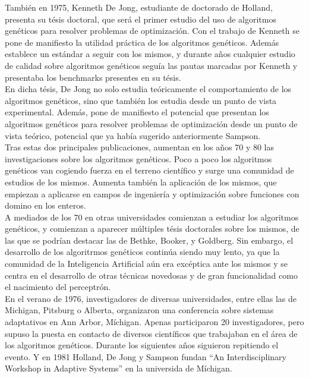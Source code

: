\documentclass[12pt]{article} \usepackage[utf8x]{inputenc}
\begin{document}
También en 1975, Kenneth De Jong, estudiante de doctorado de Holland,
presenta su tésis doctoral, que será el primer estudio del uso de
algoritmos genéticos para resolver problemas de optimización. Con el
trabajo de Kenneth se pone de manifiesto la utilidad práctica de los
algoritmos genéticos. Además establece un estándar a seguir con los
mismos, y durante años cualquier estudio de calidad sobre algoritmos
genéticos seguía las pautas marcadas por Kenneth y presentaba
los benchmarks presentes en su tésis.\\

En dicha tésis, De Jong no solo estudia teóricamente el comportamiento
de los algoritmos genéticos, sino que también los estudia desde un
punto de vista experimental. Además, pone de manifiesto el potencial
que presentan los algoritmos genéticos para resolver problemas de
optimización desde un punto de vista teórico,
potencial que ya había sugerido anteriormente Sampson.\\

Tras estas dos principales publicaciones, aumentan en los años 70 y 80
las investigaciones sobre los algoritmos genéticos. Poco a poco los
algoritmos genéticos van cogiendo fuerza en el terreno científico y
surge una comunidad de estudios de los mismos.  Aumenta también la
aplicación de los mismos, que empiezan a aplicarse en campos de
ingeniería y optimización sobre funciones con domino en los enteros.\\

A mediados de los 70 en otras universidades comienzan a estudiar los
algoritmos genéticos, y comienzan a aparecer múltiples tésis
doctorales sobre los mismos, de las que se podrían destacar las de
Bethke, Booker, y Goldberg. Sin embargo, el desarrollo de los
algoritrmos genéticos continúa siendo muy lento, ya que la comunidad
de la Inteligencia Artificial aún era excéptica ante los mismos y se
centra en el desarrollo de otras técnicas novedosas
y de gran funcionalidad como el nacimiento del perceptrón.\\

En el verano de 1976, investigadores de diversas universidades, entre
ellas las de Michigan, Pitsburg o Alberta, organizaron una conferencia
sobre sistemas adaptativos en Ann Arbor, Míchigan. Apenas participaron
20 investigadores, pero supuso la puesta en contacto de diversos
científicos que trabajaban en el área de los algoritmos
genéticos. Durante los siguientes años siguieron repitiendo el
evento. Y en 1981 Holland, De Jong y Sampson fundan ``An
Interdisciplinary Workshop in Adaptive Systems'' en la universida de Míchigan.\\
\end{document}
